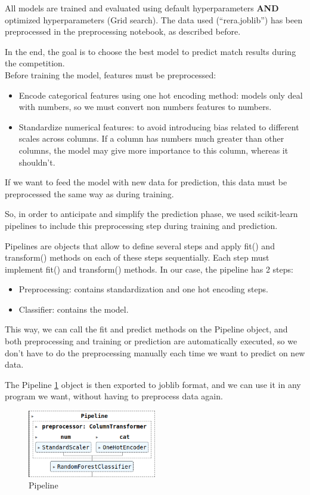 \documentclass[a4paper,12pt]{article}
\begin{document}
All models are trained and evaluated using default hyperparameters \textbf{AND} optimized hyperparameters (Grid search).  
The data used (``rera.joblib'') has been preprocessed in the preprocessing notebook, as described before.
  
In the end, the goal is to choose the best model to predict match results during the competition.\\

Before training the model, features must be preprocessed:
\begin{itemize}
    \item Encode categorical features using one hot encoding method: models only deal with numbers, so we must convert non numbers features to numbers.
    \item Standardize numerical features: to avoid introducing bias related to different scales across columns. If a column has numbers much greater than other columns, the model may give more importance to this column, whereas it shouldn't.
\end{itemize}
If we want to feed the model with new data for prediction, this data must be preprocessed the same way as during training.

So, in order to anticipate and simplify the prediction phase, we used scikit-learn pipelines to include this preprocessing step during training and prediction.

Pipelines are objects that allow to define several steps and apply fit() and transform() methods on each of these steps sequentially. Each step must implement fit() and transform() methods.
In our case, the pipeline has 2 steps:
\begin{itemize}
    \item Preprocessing: contains standardization and one hot encoding steps.
    \item Classifier: contains the model.
\end{itemize}
This way, we can call the fit and predict methods on the Pipeline object, and both preprocessing and training or prediction are automatically executed, so we don't have to do the preprocessing manually each time we want to predict on new data.

The Pipeline \ref{fig:pipeline} object is then exported to joblib format, and we can use it in any program we want, without having to preprocess data again.\\

\begin{figure}[H]
  \centering
  \includegraphics[width=0.5\textwidth]{./images/pipeline.png}
  \caption{Pipeline}
  \label{fig:pipeline}
\end{figure}
\end{document}
